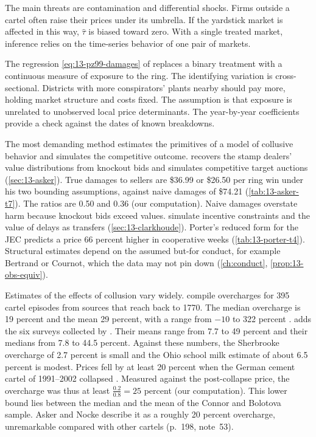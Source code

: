 The main threats are contamination and differential shocks. Firms outside a cartel often raise their prices under
its umbrella. If the yardstick market is affected in this way, $\hat\tau$ is biased toward zero. With a single treated
market, inference relies on the time-series behavior of one pair of markets.

The regression \eqref{eq:13-pz99-damages} of \citet{PorterZona1999} replaces a binary treatment with a continuous
measure of exposure to the ring. The identifying variation is cross-sectional. Districts with more conspirators'
plants nearby should pay more, holding market structure and costs fixed. The assumption is that exposure is
unrelated to unobserved local price determinants. The year-by-year coefficients provide a check against the dates of
known breakdowns.

The most demanding method estimates the primitives of a model of collusive behavior and simulates the competitive
outcome. \citet{Asker2010} recovers the stamp dealers' value distributions from knockout bids and simulates
competitive target auctions (\cref{sec:13-asker}). True damages to sellers are \$36.99 or \$26.50 per ring win under
his two bounding assumptions, against naive damages of \$74.21 (\cref{tab:13-asker-t7}). The ratios are 0.50 and 0.36
(our computation). Naive damages overstate harm because knockout bids exceed values. \citet{ClarkHoude2013} simulate
incentive constraints and the value of delays as transfers (\cref{sec:13-clarkhoude}). Porter's reduced form for the
JEC predicts a price 66 percent higher in cooperative weeks (\cref{tab:13-porter-t4}). Structural estimates depend on
the assumed but-for conduct, for example Bertrand or Cournot, which the data may not pin down (\cref{ch:conduct},
\cref{prop:13-obs-equiv}).

Estimates of the effects of collusion vary widely. \citet{ConnorBolotova2006} compile overcharges for 395 cartel
episodes from sources that reach back to 1770. The median overcharge is 19 percent and the mean 29 percent, with a
range from $-10$ to 322 percent \citep[pp.~214--215]{AskerNocke2021}.  adds the six
surveys collected by \citet[Table~7]{ErutkuHildebrand2010}. Their means range from 7.7 to 49 percent and their
medians from 7.8 to 44.5 percent. Against these numbers, the Sherbrooke overcharge of 2.7 percent is small and the
Ohio school milk estimate of about 6.5 percent is modest. Prices fell by at least 20 percent when the German cement
cartel of 1991--2002 collapsed \citep[p.~198]{AskerNocke2021}. Measured against the post-collapse price, the
overcharge was thus at least $\frac{0.2}{0.8} = 25$ percent (our computation). This lower bound lies between the
median and the mean of the Connor and Bolotova sample. Asker and Nocke describe it as a roughly 20 percent
overcharge, unremarkable compared with other cartels (p.~198, note~53).

